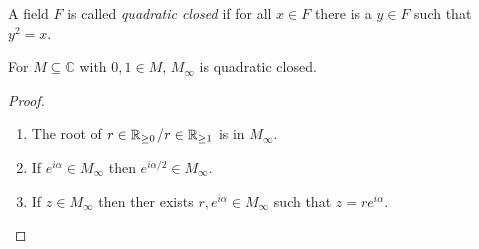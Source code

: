 \begin{frame}[fragile]
    \begin{definition}
        \label{def:quadritc_closed_field}
        \leanok
        A field $F$ is called \emph{quadratic closed} if for all $x \in F$ there is a $y \in F$ such that $y^2 = x$.
    \end{definition}

    \begin{lemma}
        \label{lem:M_inf_quad_closed}
        \leanok
        For $M\subseteq \mathbb{C}$ with $0,1 \in M$, $M_{\infty}$ is quadratic closed.
    \end{lemma}
    \pause
    \begin{proof}
        \begin{enumerate}
            \item The root of $r\in \mathbb{R}_{\ge 0}$/$r\in \mathbb{R}_{\ge 1}$ is in $M_{\infty}$.
            \pause
            \item If $e^{i\alpha}\in M_{\infty}$ then $e^{i\alpha/2}\in M_{\infty}$.
            \pause
            \item If $z\in M_{\infty}$ then ther exists $r, e^{i\alpha}\in M_{\infty}$ such that $z = r e^{i\alpha}$.
        \end{enumerate}
    \end{proof}
\end{frame}

